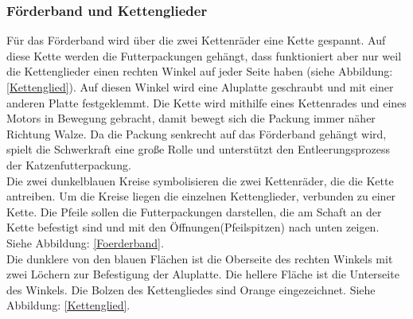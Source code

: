 \subsubsection{Förderband und Kettenglieder}

Für das Förderband wird über die zwei Kettenräder eine Kette gespannt. Auf diese Kette werden die Futterpackungen gehängt, dass funktioniert aber nur weil die Kettenglieder einen rechten Winkel auf jeder Seite haben (siehe Abbildung: \ref{Kettenglied}). Auf diesen Winkel wird eine Aluplatte geschraubt und mit einer anderen Platte festgeklemmt. Die Kette wird mithilfe eines Kettenrades und eines Motors in Bewegung gebracht, damit bewegt sich die Packung immer näher Richtung Walze. Da die Packung senkrecht auf das Förderband gehängt wird, spielt die Schwerkraft eine große Rolle und unterstützt den Entleerungsprozess der Katzenfutterpackung.\\ Die zwei dunkelblauen Kreise symbolisieren die zwei Kettenräder, die die Kette antreiben. Um die Kreise liegen die einzelnen Kettenglieder, verbunden zu einer Kette. Die Pfeile sollen die Futterpackungen darstellen, die am Schaft an der Kette befestigt sind und mit den Öffnungen(Pfeilspitzen) nach unten zeigen. Siehe Abbildung: \ref{Foerderband}. \\
Die dunklere von den blauen Flächen ist die Oberseite des rechten Winkels mit zwei Löchern zur Befestigung der Aluplatte. Die hellere Fläche ist die Unterseite des Winkels. Die Bolzen des Kettengliedes sind Orange eingezeichnet. Siehe Abbildung: \ref{Kettenglied}.

